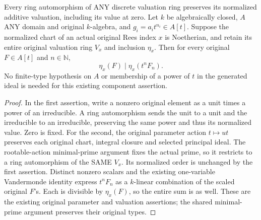 \begin{lemma}
\label{lem:actual-original-rees-component-inputs}
\leanok
{}
Every ring automorphism of ANY discrete valuation ring preserves its
normalized additive valuation, including its value at zero.
Let $k$ be algebraically closed, $A$ ANY domain and original
$k$-algebra, and $g_i=a_it^{n_i}\in A[t]$. Suppose the normalized
chart of an actual original Rees index $x$ is Noetherian, and retain
its entire original valuation ring $V_x$ and inclusion $\eta_x$.
Then for every original $F\in A[t]$ and $n\in\mathbb N$,
\[
 \eta_x(F)\mid\eta_x(t^nF_n).
\]
No finite-type hypothesis on $A$ or membership of a power of $t$ in
the generated ideal is needed for this existing component assertion.
\end{lemma}
\begin{proof}
In the first assertion, write a nonzero original element as a unit
times a power of an irreducible. A ring automorphism sends the unit
to a unit and the irreducible to an irreducible, preserving the same
power and thus its normalized value. Zero is fixed.
For the second, the original parameter action $t\mapsto ut$ preserves
each original chart, integral closure and selected principal ideal.
The rootable-action minimal-prime argument fixes the actual prime,
so it restricts to a ring automorphism of the SAME $V_x$. Its
normalized order is unchanged by the first assertion. Distinct
nonzero scalars and the existing one-variable Vandermonde identity
express $t^nF_n$ as a $k$-linear combination of the scaled original
$F$'s. Each is divisible by $\eta_x(F)$, so the entire sum is as well.
These are the existing original parameter and valuation assertions;
the shared minimal-prime argument preserves their original types.
\end{proof}

